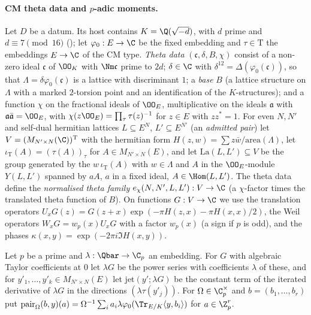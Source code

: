 \paragraph{CM theta data and $p$-adic moments.}
Let $D$ be a datum. Its host contains $K=\Q(\sqrt{-d})$, with $d$ prime and $d\equiv7\pmod{16}$
(); let $\varphi_0:E\to\C$ be the fixed embedding and
$\tau\in\mathrm T$ the embeddings $E\to\C$ of the CM type. \emph{Theta data} $(\mathfrak c,\delta,B,\chi)$ consist of a non-zero ideal
$\mathfrak c$ of $\OO_K$ with $\Nm\mathfrak c$ prime to $2d$; $\delta\in\C$ with $\delta^{12}=\Delta(\varphi_0(\mathfrak c))$, so that
$\Lambda=\delta\varphi_0(\mathfrak c)$ is a lattice with discriminant $1$; a \emph{base} $B$ (a lattice structure on $\Lambda$ with a
marked $2$-torsion point and an identification of the $K$-structures); and a function $\chi$ on the fractional ideals of
$\OO_E$, multiplicative on the ideals $\mathfrak a$ with $\mathfrak a\bar{\mathfrak a}=\OO_E$, with
$\chi(z\OO_E)=\prod_\tau\tau(z)^{-1}$ for $z\in E$ with $zz^*=1$. For even $N,N'$ and self-dual hermitian lattices
$L\subseteq E^N$, $L'\subseteq E^{N'}$ (an \emph{admitted pair}) let $V=(M_{N'\times N}(\C))^{\mathrm T}$ with the hermitian form
$H(z,w)=\sum z\bar w/\mathrm{area}(\Lambda)$, let $\iota_{\mathrm T}(A)=(\tau(A))_\tau$ for $A\in M_{N'\times N}(E)$, and let
$\mathrm{La}(L,L')\subseteq V$ be the group generated by the $w\,\iota_{\mathrm T}(A)$ with $w\in\Lambda$ and $A$ in the
$\OO_E$-module $Y(L,L')$ spanned by $aA$, $a$ in a fixed ideal, $A\in\Hom(L,L')$. The theta data define the \emph{normalised
theta family} $e_\chi(N,N',L,L'):V\to\C$ (a $\chi$-factor times the translated theta function of $B$). On functions $G:V\to\C$
we use the translation operators $U_xG(z)=G(z+x)\exp(-\pi H(z,x)-\pi H(x,x)/2)$, the Weil operators $W_xG=w_p(x)U_xG$ with a factor
$w_p(x)$ (a sign if $p$ is odd), and the phases $\kappa(x,y)=\exp(-2\pi i\Im H(x,y))$.

Let $p$ be a prime and $\lambda:\Qbar\to\C_p$ an embedding. For $G$ with algebraic Taylor coefficients at $0$ let $\lambda G$ be the
power series with coefficients $\lambda$ of these, and for $y'_1,\dots,y'_k\in M_{N'\times N}(E)$ let $\mathrm{jet}(y';\lambda G)$ be the
constant term of the iterated derivative of $\lambda G$ in the directions $(\lambda\tau(y'_j))$. For $\Omega\in\C_p^\times$ and
$b=(b_1,\dots,b_r)$ put $\mathrm{pair}_\Omega(b,y)(a)=\Omega^{-1}\sum_ia_i\lambda\varphi_0(\Tr_{E/K}\langle y,b_i\rangle)$ for
$a\in\Z_p^r$.

